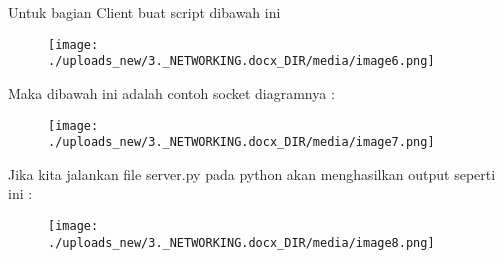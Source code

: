 \documentclass[a4paper,12pt]{report}
\begin{document}
 \par
Untuk bagian Client buat script dibawah ini \par
\begin{center}



\begin{figure}[H]
\begin{center}
\texttt{[image: ./uploads\_new/3.\_NETWORKING.docx\_DIR/media/image6.png]}
\end{center}
\end{figure}




\end{center}\vspace{12pt}
Maka dibawah ini adalah contoh socket diagramnya : \par
\begin{center}



\begin{figure}[H]
\begin{center}
\texttt{[image: ./uploads\_new/3.\_NETWORKING.docx\_DIR/media/image7.png]}
\end{center}
\end{figure}




\end{center}\vspace{12pt}
Jika kita jalankan file server.py pada python akan menghasilkan output seperti ini : \par
\begin{center}



\begin{figure}[H]
\begin{center}
\texttt{[image: ./uploads\_new/3.\_NETWORKING.docx\_DIR/media/image8.png]}
\end{center}
\end{figure}




\end{center}\vspace{12pt}
\end{document}
